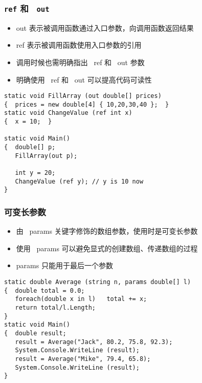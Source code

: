 \begin{frame}[fragile]
\frametitle{\texttt{ref} 和 ~\texttt{out}}
\begin{itemize}
\item out 表示被调用函数通过入口参数，向调用函数返回结果
\item ref 表示被调用函数使用入口参数的引用
\item 调用时候也需明确指出 ~ref 和 ~out 参数
\item 明确使用 ~ref 和 ~out 可以提高代码可读性
\end{itemize}
\pause
\begin{lstlisting}
static void FillArray (out double[] prices)
{  prices = new double[4] { 10,20,30,40 };  }
static void ChangeValue (ref int x)
{  x = 10;  }

static void Main()
{  double[] p;
   FillArray(out p);

   int y = 20;
   ChangeValue (ref y); // y is 10 now
}
\end{lstlisting}
\end{frame}


\begin{frame}[fragile]
\frametitle{可变长参数}
\begin{itemize}
\item 由 ~params 关键字修饰的数组参数，使用时是可变长参数
\item 使用 ~params 可以避免显式的创建数组、传递数组的过程
\item params 只能用于最后一个参数
\end{itemize}
\pause
\begin{lstlisting}
static double Average (string n, params double[] l)
{  double total = 0.0;
   foreach(double x in l)   total += x;
   return total/l.Length;
}
static void Main()
{  double result;
   result = Average("Jack", 80.2, 75.8, 92.3);
   System.Console.WriteLine (result);
   result = Average("Mike", 79.4, 65.8);
   System.Console.WriteLine (result);
}
\end{lstlisting}
\end{frame}

